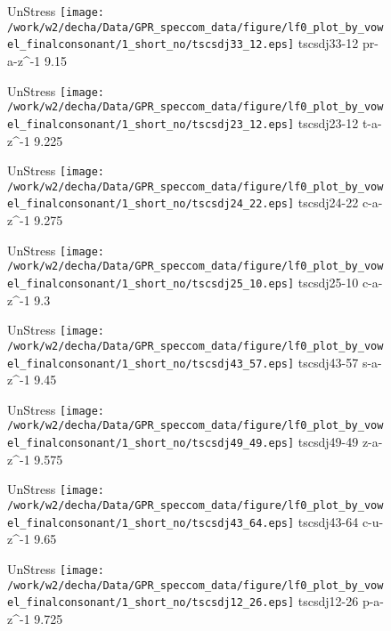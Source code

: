 \documentclass{article}
\begin{document}
\begin{figure}[t]
\begin{minipage}[b]{.24\textwidth}
UnStress
\centering
\texttt{[image: /work/w2/decha/Data/GPR\_speccom\_data/figure/lf0\_plot\_by\_vowel\_finalconsonant/1\_short\_no/tscsdj33\_12.eps]}
tscsdj33-12 pr-a-z\textasciicircum-1 9.15
\end{minipage}
\begin{minipage}[b]{.24\textwidth}
UnStress
\centering
\texttt{[image: /work/w2/decha/Data/GPR\_speccom\_data/figure/lf0\_plot\_by\_vowel\_finalconsonant/1\_short\_no/tscsdj23\_12.eps]}
tscsdj23-12 t-a-z\textasciicircum-1 9.225
\end{minipage}
\begin{minipage}[b]{.24\textwidth}
UnStress
\centering
\texttt{[image: /work/w2/decha/Data/GPR\_speccom\_data/figure/lf0\_plot\_by\_vowel\_finalconsonant/1\_short\_no/tscsdj24\_22.eps]}
tscsdj24-22 c-a-z\textasciicircum-1 9.275
\end{minipage}
\begin{minipage}[b]{.24\textwidth}
UnStress
\centering
\texttt{[image: /work/w2/decha/Data/GPR\_speccom\_data/figure/lf0\_plot\_by\_vowel\_finalconsonant/1\_short\_no/tscsdj25\_10.eps]}
tscsdj25-10 c-a-z\textasciicircum-1 9.3
\end{minipage}
\end{figure}
\clearpage
\begin{figure}[t]
\begin{minipage}[b]{.24\textwidth}
UnStress
\centering
\texttt{[image: /work/w2/decha/Data/GPR\_speccom\_data/figure/lf0\_plot\_by\_vowel\_finalconsonant/1\_short\_no/tscsdj43\_57.eps]}
tscsdj43-57 s-a-z\textasciicircum-1 9.45
\end{minipage}
\begin{minipage}[b]{.24\textwidth}
UnStress
\centering
\texttt{[image: /work/w2/decha/Data/GPR\_speccom\_data/figure/lf0\_plot\_by\_vowel\_finalconsonant/1\_short\_no/tscsdj49\_49.eps]}
tscsdj49-49 z-a-z\textasciicircum-1 9.575
\end{minipage}
\begin{minipage}[b]{.24\textwidth}
UnStress
\centering
\texttt{[image: /work/w2/decha/Data/GPR\_speccom\_data/figure/lf0\_plot\_by\_vowel\_finalconsonant/1\_short\_no/tscsdj43\_64.eps]}
tscsdj43-64 c-u-z\textasciicircum-1 9.65
\end{minipage}
\begin{minipage}[b]{.24\textwidth}
UnStress
\centering
\texttt{[image: /work/w2/decha/Data/GPR\_speccom\_data/figure/lf0\_plot\_by\_vowel\_finalconsonant/1\_short\_no/tscsdj12\_26.eps]}
tscsdj12-26 p-a-z\textasciicircum-1 9.725
\end{minipage}
\end{figure}
\end{document}
